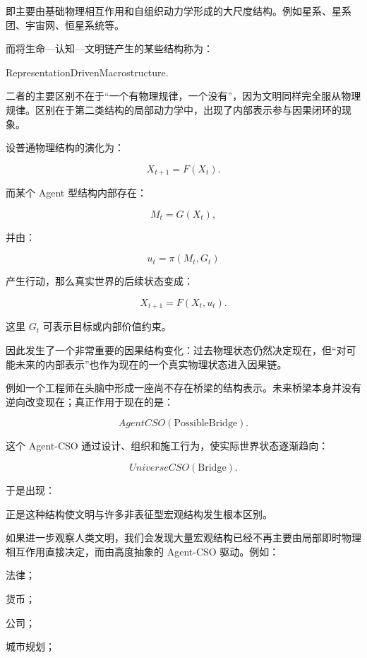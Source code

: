 即主要由基础物理相互作用和自组织动力学形成的大尺度结构。例如星系、星系团、宇宙网、恒星系统等。

而将生命—认知—文明链产生的某些结构称为：

\begin{statementbox}
RepresentationDrivenMacrostructure.
\end{statementbox}

二者的主要区别不在于“一个有物理规律，一个没有”，因为文明同样完全服从物理规律。区别在于第二类结构的局部动力学中，出现了内部表示参与因果闭环的现象。

设普通物理结构的演化为：

\[
X_{t+1}
=
F(X_t).
\]

而某个 Agent 型结构内部存在：

\[
M_t
=
G(X_t),
\]

并由：

\[
u_t
=
\pi(M_t,G_t)
\]

产生行动，那么真实世界的后续状态变成：

\[
X_{t+1}
=
F(X_t,u_t).
\]

这里 $G_t$ 可表示目标或内部价值约束。

因此发生了一个非常重要的因果结构变化：过去物理状态仍然决定现在，但“对可能未来的内部表示”也作为现在的一个真实物理状态进入因果链。

例如一个工程师在头脑中形成一座尚不存在桥梁的结构表示。未来桥梁本身并没有逆向改变现在；真正作用于现在的是：

\[
AgentCSO(\text{PossibleBridge}).
\]

这个 Agent-CSO 通过设计、组织和施工行为，使实际世界状态逐渐趋向：

\[
UniverseCSO(\text{Bridge}).
\]

于是出现：

\begin{statementbox}
\centering
{}
\end{statementbox}

正是这种结构使文明与许多非表征型宏观结构发生根本区别。

如果进一步观察人类文明，我们会发现大量宏观结构已经不再主要由局部即时物理相互作用直接决定，而由高度抽象的 Agent-CSO 驱动。例如：

法律；

货币；

公司；

城市规划；

